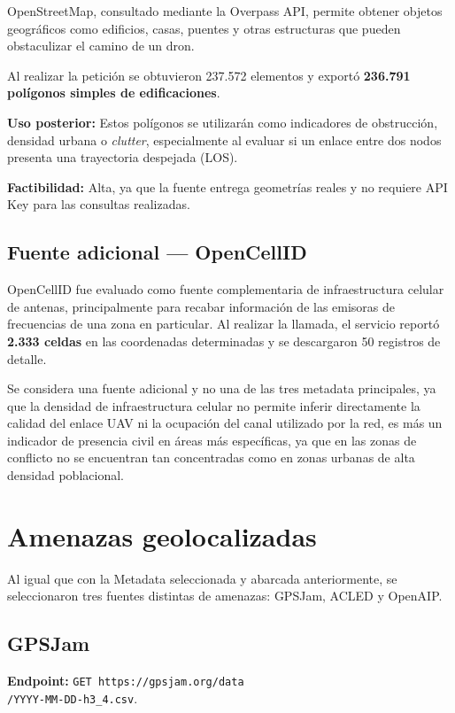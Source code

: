 \documentclass[journal,10pt]{IEEEtran}
\begin{document}
OpenStreetMap, consultado mediante la Overpass API, permite obtener objetos geográficos como
edificios, casas, puentes y otras estructuras que pueden obstaculizar el camino de un dron.

Al realizar la petición se obtuvieron 237.572 elementos y exportó
\textbf{236.791 polígonos simples de edificaciones}.

\textbf{Uso posterior:} Estos polígonos se utilizarán como indicadores de obstrucción,
densidad urbana o \textit{clutter}, especialmente al evaluar si un enlace entre dos nodos
presenta una trayectoria despejada (LOS).

\textbf{Factibilidad:} Alta, ya que la fuente entrega geometrías reales y no requiere API Key para las
consultas realizadas.

\subsection{Fuente adicional --- OpenCellID}

OpenCellID fue evaluado como fuente complementaria de infraestructura celular de antenas, principalmente para recabar información de las emisoras de frecuencias de una zona en particular. Al realizar la llamada, el servicio reportó \textbf{2.333 celdas} en las coordenadas determinadas y se
descargaron 50 registros de detalle.

Se considera una fuente adicional y no una de las tres metadata principales, ya que la densidad
de infraestructura celular no permite inferir directamente la calidad del enlace UAV ni la
ocupación del canal utilizado por la red, es más un indicador de presencia civil en áreas más específicas, ya que en las zonas de conflicto no se encuentran tan concentradas como en zonas urbanas de alta densidad poblacional.

\section{Amenazas geolocalizadas}

Al igual que con la Metadata seleccionada y abarcada anteriormente, se seleccionaron tres fuentes distintas de amenazas: GPSJam, ACLED
y OpenAIP.

\subsection{GPSJam}
\textbf{Endpoint:}
\texttt{GET https://gpsjam.org/data \\ 
/YYYY-MM-DD-h3\_4.csv}.
\end{document}
